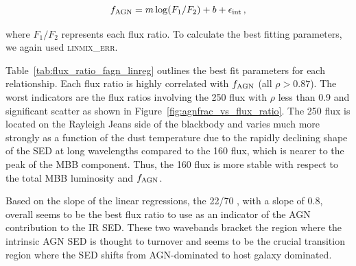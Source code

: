 \documentclass[fleqn, usenatbib]{mnras}
\begin{document}
\begin{equation}
f_{\rm AGN} = m\log(F_{1}/F_{2}) + b + \epsilon_{\rm int}\,,
\end{equation}

\noindent where $F_{1}/F_{2}$ represents each flux ratio. To calculate the best fitting parameters, we again used \textsc{linmix\_err}. 

Table~\ref{tab:flux_ratio_fagn_linreg} outlines the best fit parameters for each relationship. Each flux ratio is highly correlated with $f_{\rm AGN}$ (all $\rho > 0.87$). The worst indicators are the flux ratios involving the 250 \micron{} flux with $\rho$ less than 0.9 and significant scatter as shown in Figure~\ref{fig:agnfrac_vs_flux_ratio}. The 250 \micron{} flux is located on the Rayleigh Jeans side of the blackbody and varies much more strongly as a function of the dust temperature due to the rapidly declining shape of the SED at long wavelengths compared to the 160 \micron{} flux, which is nearer to the peak of the MBB component. Thus, the 160 \micron{} flux is more stable with respect to the total MBB luminosity and $f_{\rm AGN}$.

Based on the slope of the linear regressions, the 22/70 \micron{}, with a slope of 0.8, overall seems to be the best flux ratio to use as an indicator of the AGN contribution to the IR SED. These two wavebands bracket the region where the intrinsic AGN SED is thought to turnover \citep[e.g.][]{Netzer:2007ve, Mullaney:2011yq} and seems to be the crucial transition region where the SED shifts from AGN-dominated to host galaxy dominated.  

\end{document}
